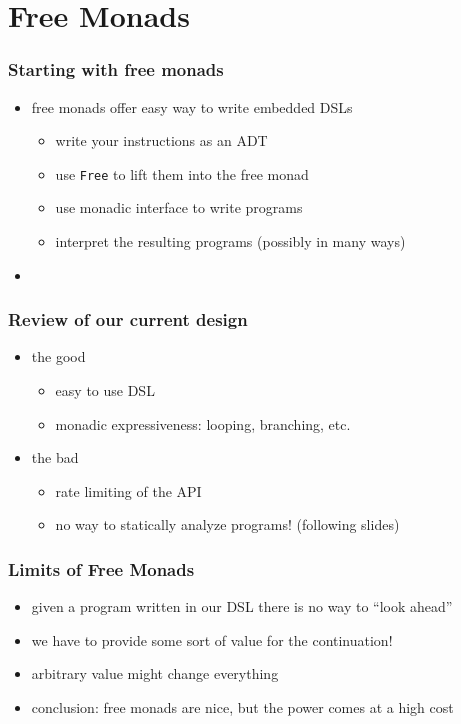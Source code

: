 \documentclass[compress]{beamer}
\begin{document}
\section{Free Monads}
\label{sec:free-monads}

\begin{frame}
  \frametitle{Starting with free monads}
  \begin{itemize}
  \item free monads offer easy way to write embedded DSLs
    \begin{itemize}
    \item write your instructions as an ADT
    \item use \texttt{Free} to lift them into the free monad
    \item use monadic interface to write programs
    \item interpret the resulting programs (possibly in many ways)
    \end{itemize}
  \item
  \end{itemize}
\end{frame}

\begin{frame}
  \frametitle{Review of our current design}
  \begin{itemize}
  \item the good
    \begin{itemize}
    \item easy to use DSL
    \item monadic expressiveness: looping, branching, etc.
    \end{itemize}
  \item the bad
    \begin{itemize}
    \item rate limiting of the API
    \item no way to statically analyze programs! (following slides)
    \end{itemize}
  \end{itemize}
\end{frame}

\begin{frame}
  \frametitle{Limits of Free Monads}
  \begin{itemize}
  \item given a program written in our DSL there is no way to ``look
    ahead''
  \item we have to provide some sort of value for the continuation!
  \item arbitrary value might change everything
  \item conclusion: free monads are nice, but the power comes at a
    high cost
  \end{itemize}
\end{frame}
\end{document}
